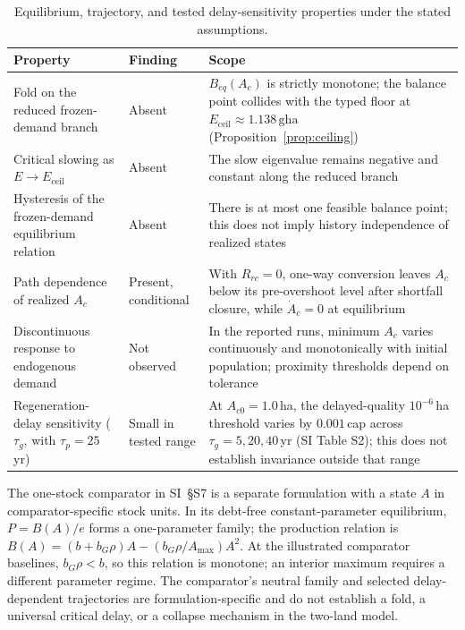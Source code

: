 \documentclass[preprint,12pt,authoryear]{elsarticle}
\newcommand{\Eceil}{E_{\mathrm{ceil}}}
\begin{document}
\begin{table}[!htbp]
\centering\footnotesize
\caption{Equilibrium, trajectory, and tested delay-sensitivity properties under the stated assumptions.}
\label{tab:neg}
\begin{tabularx}{\textwidth}{>{\raggedright\arraybackslash}p{} l >{\raggedright\arraybackslash}X}
\toprule
Property & Finding & Scope \\
\midrule
Fold on the reduced frozen-demand branch & Absent & $B_{eq}(A_c)$ is strictly monotone; the balance point collides with the typed floor at $\Eceil\approx1.138\,\mathrm{gha}$ (Proposition~\ref{prop:ceiling}) \\
Critical slowing as $E\to\Eceil$ & Absent & The slow eigenvalue remains negative and constant along the reduced branch \\
Hysteresis of the frozen-demand equilibrium relation & Absent & There is at most one feasible balance point; this does not imply history independence of realized states \\
Path dependence of realized $A_c$ & Present, conditional & With $R_{rc}=0$, one-way conversion leaves $A_c$ below its pre-overshoot level after shortfall closure, while $\dot A_c=0$ at equilibrium \\
Discontinuous response to endogenous demand & Not observed & In the reported runs, minimum $A_c$ varies continuously and monotonically with initial population; proximity thresholds depend on tolerance \\
Regeneration-delay sensitivity ($\tau_g$, with $\tau_p=25$\,yr) & Small in tested range & At $A_{c0}=1.0$\,ha, the delayed-quality $10^{-6}$\,ha threshold varies by $0.001$\,cap across $\tau_g=5,20,40$\,yr (SI Table S2); this does not establish invariance outside that range \\
\bottomrule
\end{tabularx}
\end{table}

The one-stock comparator in SI~\S S7 is a separate formulation with a state $A$ in comparator-specific stock units. In its debt-free constant-parameter equilibrium, $P=B(A)/e$ forms a one-parameter family; the production relation is $B(A)=(b+b_G\rho)A-(b_G\rho/A_{\max})A^2$. At the illustrated comparator baselines, $b_G\rho<b$, so this relation is monotone; an interior maximum requires a different parameter regime. The comparator's neutral family and selected delay-dependent trajectories are formulation-specific and do not establish a fold, a universal critical delay, or a collapse mechanism in the two-land model.
\end{document}
